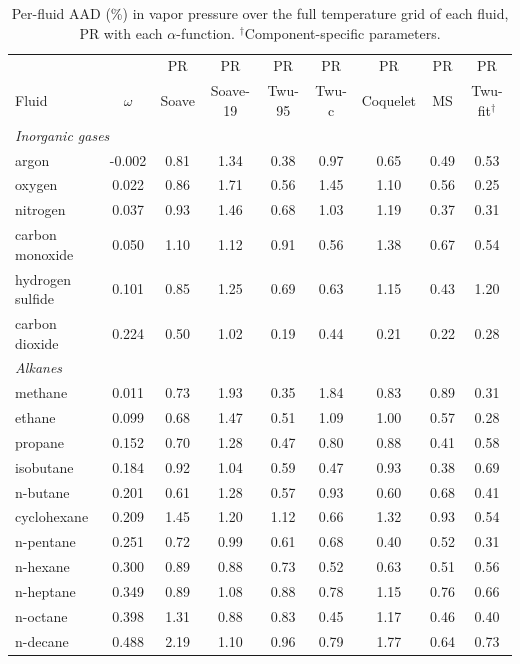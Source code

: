 \begin{table}[H]
\centering
\caption{Per-fluid AAD (\%) in vapor pressure over the full temperature grid of each fluid, PR with each $\alpha$-function. $^{\dagger}$Component-specific parameters.}
\label{tab:tabS_perfluid_psat_pr}
\small
\begin{tabular}{lcccccccc}
\toprule
 &  & PR & PR & PR & PR & PR & PR & PR \\
Fluid & $\omega$ & Soave & Soave-19 & Twu-95 & Twu-c & Coquelet & MS & Twu-fit$^{\dagger}$ \\
\midrule
\multicolumn{9}{l}{\emph{Inorganic gases}} \\
argon & -0.002 & 0.81 & 1.34 & 0.38 & 0.97 & 0.65 & 0.49 & 0.53 \\
oxygen & 0.022 & 0.86 & 1.71 & 0.56 & 1.45 & 1.10 & 0.56 & 0.25 \\
nitrogen & 0.037 & 0.93 & 1.46 & 0.68 & 1.03 & 1.19 & 0.37 & 0.31 \\
carbon monoxide & 0.050 & 1.10 & 1.12 & 0.91 & 0.56 & 1.38 & 0.67 & 0.54 \\
hydrogen sulfide & 0.101 & 0.85 & 1.25 & 0.69 & 0.63 & 1.15 & 0.43 & 1.20 \\
carbon dioxide & 0.224 & 0.50 & 1.02 & 0.19 & 0.44 & 0.21 & 0.22 & 0.28 \\
\multicolumn{9}{l}{\emph{Alkanes}} \\
methane & 0.011 & 0.73 & 1.93 & 0.35 & 1.84 & 0.83 & 0.89 & 0.31 \\
ethane & 0.099 & 0.68 & 1.47 & 0.51 & 1.09 & 1.00 & 0.57 & 0.28 \\
propane & 0.152 & 0.70 & 1.28 & 0.47 & 0.80 & 0.88 & 0.41 & 0.58 \\
isobutane & 0.184 & 0.92 & 1.04 & 0.59 & 0.47 & 0.93 & 0.38 & 0.69 \\
n-butane & 0.201 & 0.61 & 1.28 & 0.57 & 0.93 & 0.60 & 0.68 & 0.41 \\
cyclohexane & 0.209 & 1.45 & 1.20 & 1.12 & 0.66 & 1.32 & 0.93 & 0.54 \\
n-pentane & 0.251 & 0.72 & 0.99 & 0.61 & 0.68 & 0.40 & 0.52 & 0.31 \\
n-hexane & 0.300 & 0.89 & 0.88 & 0.73 & 0.52 & 0.63 & 0.51 & 0.56 \\
n-heptane & 0.349 & 0.89 & 1.08 & 0.88 & 0.78 & 1.15 & 0.76 & 0.66 \\
n-octane & 0.398 & 1.31 & 0.88 & 0.83 & 0.45 & 1.17 & 0.46 & 0.40 \\
n-decane & 0.488 & 2.19 & 1.10 & 0.96 & 0.79 & 1.77 & 0.64 & 0.73 \\

\end{tabular}
\end{table}
